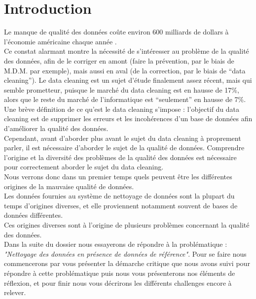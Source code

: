 \section{Introduction}
Le manque de qualité des données coûte environ 600 milliards de dollars à l’économie américaine chaque année \cite{Interaction}.\\
Ce constat alarmant montre la nécessité de s’intéresser au problème de la qualité des données, afin de le corriger en amont (faire la prévention, par le biais de M.D.M. par exemple), mais aussi en aval (de la correction, par le biais de “data cleaning”).
Le data cleaning est un sujet d’étude finalement assez récent, mais qui semble prometteur, puisque le marché du data cleaning est en hausse de 17\%, alors que le reste du marché de l’informatique est “seulement” en hausse de 7\%.\\
Une brève définition de ce qu’est le data cleaning s’impose : l’objectif du data cleaning est de supprimer les erreurs et les incohérences d’un base de données afin d’améliorer la qualité des données.\\
Cependant, avant d’aborder plus avant le sujet du data cleaning à proprement parler, il est nécessaire d’aborder le sujet de la qualité de données. Comprendre l’origine et la diversité des problèmes de la qualité des données est nécessaire pour correctement aborder le sujet du data cleaning.\\
Nous verrons donc dans un premier temps quels peuvent être les différentes origines de la mauvaise qualité de données.\\
Les données fournies au système de nettoyage de données sont la plupart du temps d’origines diverses, et elle proviennent notamment souvent de bases de données différentes.\\
Ces origines diverses sont à l’origine de plusieurs problèmes concernant la qualité des données.\\



Dans la suite du dossier nous essayerons de répondre à la problématique : \textit{"Nettoyage des données en présence de données de référence"}. Pour se faire nous commencerons par vous présenter la démarche critique que nous avons suivi pour répondre à cette problématique puis nous vous présenterons nos éléments de réflexion, et pour finir nous vous décrirons les différents challenges encore à relever. 